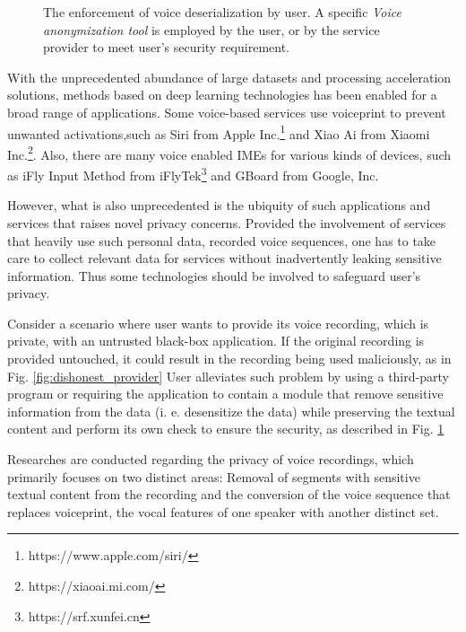 \documentclass[journal]{IEEEtran} %
\begin{document}
\begin{figure}[!t]
    \caption{The enforcement of voice deserialization by user. A specific \textit{Voice anonymization tool} is employed by the user, or by the service provider to meet user's security requirement.}
    \label{fig:privacy_enforcement}
\end{figure}

With the unprecedented abundance of large datasets and processing acceleration solutions, methods based on deep learning technologies has been enabled for a broad range of applications. Some voice-based services use voiceprint to prevent unwanted activations,such as Siri from Apple Inc.\footnote{https://www.apple.com/siri/} and Xiao Ai from Xiaomi Inc.\footnote{https://xiaoai.mi.com/}. Also, there are many voice enabled IMEs for various kinds of devices, such as iFly Input Method from iFlyTek\footnote{https://srf.xunfei.cn} and GBoard from Google, Inc.

However, what is also unprecedented is the ubiquity of such applications and services that raises novel privacy concerns. Provided the involvement of services that heavily use such personal data, recorded voice sequences, one has to take care to collect relevant data for services without inadvertently leaking sensitive information. Thus some technologies should be involved to safeguard user's privacy.

Consider a scenario where user wants to provide its voice recording, which is private, with an untrusted black-box application. If the original recording is provided untouched, it could result in the recording being used maliciously, as in Fig. \ref{fig:dishonest_provider} User alleviates such problem by using a third-party program or requiring the application to contain a module that remove sensitive information from the data (i. e. desensitize the data) while preserving the textual content and perform its own check to ensure the security, as described in Fig. \ref{fig:privacy_enforcement}

Researches are conducted regarding the privacy of voice recordings, which primarily focuses on two distinct areas: Removal of segments with sensitive textual content from the recording and the conversion of the voice sequence that replaces voiceprint, the vocal features of one speaker with another distinct set.
\end{document}
